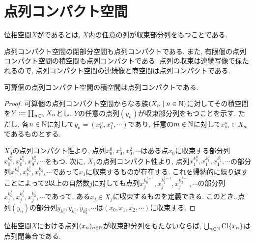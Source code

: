 \documentclass[uplatex, dvipdfmx, a4paper, 12pt, class=jsbook, crop=false]{standalone}
\begin{document}
\section{点列コンパクト空間}
\label{sec:sequentially-compact-spaces}

\begin{definition}
	位相空間$ X $がであるとは, $ X $内の任意の列が収束部分列をもつことである.
\end{definition}

点列コンパクト空間の閉部分空間も点列コンパクトである. また, 有限個の点列コンパクト空間の積空間も点列コンパクトである. 点列の収束は連続写像で保たれるので, 点列コンパクト空間の連続像と商空間は点列コンパクトである.

\begin{proposition}
	可算個の点列コンパクト空間の積空間は点列コンパクトである.
\end{proposition}

\begin{proof}
	可算個の点列コンパクト空間からなる族$ \setfamily{X_n}{n \in \N} $に対してその積空間を$ Y \mathrel{:=} \prod_{n \in \mathbb{N}} X_n $とし, $ Y $の任意の点列$ (y_n) $が収束部分列をもつことを示す. ただし, 各$ n \in \mathbb{N} $に対して$ y_n = (x_0^n, x_1^n, \cdots) $であり, 任意の$ m \in \mathbb{N} $に対して$ x_m^n \in X_m $であるものとする.

	$ X_0 $の点列コンパクト性より, 点列$ x_0^0, x_0^1, x_0^2, \cdots $はある点$ x_0 $に収束する部分列$ x_0^{k_0^0}, x_0^{k_1^0}, x_0^{k_2^0}, \cdots $をもつ. 次に, $ X_1 $の点列コンパクト性より, 点列$ x_1^{k_0^0}, x_1^{k_1^0}, x_1^{k_2^0}, \cdots $の部分列$  x_1^{k_0^1}, x_1^{k_1^1}, x_1^{k_2^1}, \cdots $であって$ x_1 $に収束するものが存在する. これを帰納的に繰り返すことによって2以上の自然数$ j $に対しても点列$ x_j^{k_0^{j-1}}, x_j^{k_1^{j-1}}, x_j^{k_2^{j-1}}, \cdots $の部分列$  x_j^{k_0^j}, x_j^{k_1^j}, x_j^{k_2^j}, \cdots $であって, ある$ x_j \in X_j $に収束するものを定義できる. このとき, 点列$ (y_n) $の部分列$ y_{k_0^0}, y_{k_1^1}, y_{k_2^2}, \cdots $は$ (x_0, x_1, x_2, \cdots) $に収束する.
\end{proof}

\begin{lemma}
	\label{lem:Lemma used in the proof of the proposition that Seq + CntCpt > SeqCpt}
	位相空間$ X $における点列$ (x_n)_{n \in \mathbb{N}} $が収束部分列をもたないならば, $ \bigcup_{n \in \mathbb{N}} \mathop{\mathrm{Cl}}\nolimits \{x_n\} $は点列閉集合である.
\end{lemma}
\end{document}
